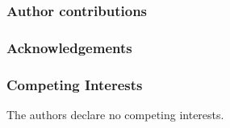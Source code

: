 \subsubsection*{Author contributions}

\lipsum[1]

\subsubsection*{Acknowledgements}

\lipsum[1]

\subsubsection*{Competing Interests}
The authors declare no competing interests.
